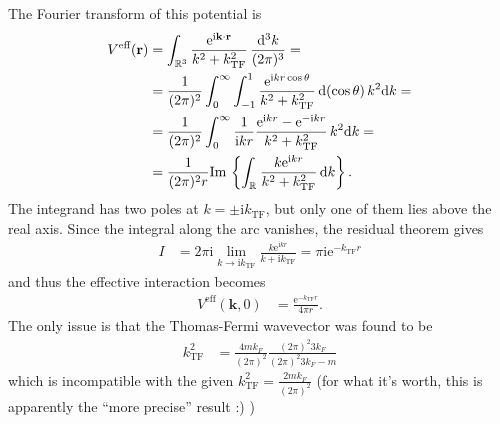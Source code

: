 \documentclass[english, parskip=full]{scrartcl}
\newcommand{\intx}{}
\newcommand{\intr}{}
\newcommand{\klammer}{}
\newcommand{\tecxt}{}
\renewcommand{\i}{\text{i}}
\newcommand{\e}{\text{e}}
\begin{document}
The Fourier transform of this potential is
\begin{align}
V^\tecxt\text{eff}(\textbf{r}) &= \intr\int_{\mathbb{R}^{3}} \frac{\e^{\i \textbf{k}\cdot \textbf{r}}}{k^2 + k_\text{TF}^2} \, \frac{\mathrm{d}^{3}k}{(2\pi)^3} = \\
&= \frac{1}{(2\pi)^2} \intx\int_{0}^{\infty} \intx\int_{-1}^{1} \frac{\e^{\i kr\cos\theta} }{k^2 + k_\text{TF}^2} \, \mathrm{d}(\cos\theta)\, k^2\mathrm{d}k = \\
&= \frac{1}{(2\pi)^2} \intx\int_{0}^{\infty} \frac{1}{\i kr} \frac{\e^{\i kr} - \e^{-\i kr}}{k^2 + k_\text{TF}^2} \, k^2\mathrm{d}k = \\
&= \frac{1}{(2\pi)^2 r} \tecxt\text{Im\,} \klammer\left\{ \intr\int_{\mathbb{R}^{ }} \frac{k\e^{\i kr}}{k^2 + k_\text{TF}^2} \, \mathrm{d}k \right\}.
\end{align}
The integrand has two poles at $k = \pm\i k_\text{TF}$, but only one of them lies above the real axis.
Since the integral along the arc vanishes, the residual theorem gives
\begin{align}
I &= 2\pi\i \lim _{k \rightarrow \i k_\tecxt\text{TF}} \frac{k\e^{\i kr}}{k + \i k_\text{TF}} = \pi\i \e^{-k_\text{TF}r}
\end{align}
and thus the effective interaction becomes
\begin{align}
V^\tecxt\text{eff}(\textbf{k},0) &= \frac{\e^{-k_\text{TF}r}}{4\pi r}.
\end{align}
The only issue is that the Thomas-Fermi wavevector was found to be
\begin{align}
k_\text{TF}^2 &= \frac{4mk_F}{(2\pi)^2} \frac{(2\pi)^2 3k_F}{(2\pi)^2 3k_F - m}
\end{align}
which is incompatible with the given $k_\text{TF}^2 = \frac{2mk_F}{(2\pi)^2}$ (for what it's worth, this is apparently the ``more precise'' result :) )

\end{document}
